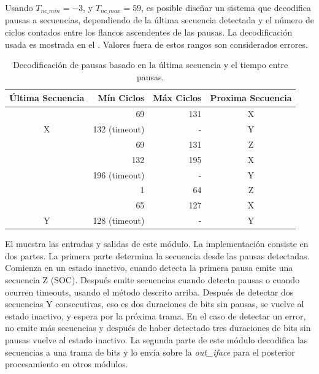 \documentclass[a4paper, twoside, 11pt]{report}
\begin{document}
Usando $T_{nc\_min} = -3$, y $T_{nc\_max} = 59$, es posible diseñar un sistema que decodifica pausas a secuencias, dependiendo de la última secuencia detectada y el número de ciclos contados entre los flancos ascendentes de las pausas. La decodificación usada es mostrada en el . Valores fuera de estos rangos son considerados errores.

\begin{table}[htb]
  \centering
  \begin{tabular}{c|r|r|c}
    \rowcolor{lightgray!35}
    \textbf{Última Secuencia} & \textbf{Mín Ciclos} & \textbf{Máx Ciclos} & \textbf{Proxima Secuencia} \\
    \hline
                        & 69             & 131   & X \\
    \multirow{-2}{*}{X} & 132 (timeout)  & -     & Y \\
    \rowcolor{lightgray!35}
                        & 69             & 131   & Z \\
    \rowcolor{lightgray!35}
                        & 132            & 195   & X \\
    \rowcolor{lightgray!35}
    \multirow{-3}{*}{Z} & 196 (timeout)  & -     & Y \\
                        & 1              & 64    & Z \\
                        & 65             & 127   & X \\
    \multirow{-3}{*}{Y} & 128 (timeout)  & -     & Y \\
  \end{tabular}
  \caption{Decodificación de pausas basado en la última secuencia y el tiempo entre pausas.}
  \label{tab:sequence_decode_timings}
\end{table}

El  muestra las entradas y salidas de este módulo. La implementación consiste en dos partes. La primera parte determina la secuencia desde las pausas detectadas. Comienza en un estado inactivo, cuando detecta la primera pausa emite una secuencia Z (SOC). Después emite secuencias cuando detecta pausas o cuando ocurren timeouts, usando el método descrito arriba. Después de detectar dos secuencias Y consecutivas, eso es dos duraciones de bits sin pausas, se vuelve al estado inactivo, y espera por la próxima trama. En el caso de detectar un error, no emite más secuencias y después de haber detectado tres duraciones de bits sin pausas vuelve al estado inactivo. La segunda parte de este módulo decodifica las secuencias a una trama de bits y lo envía sobre la \textit{out\_iface} para el posterior procesamiento en otros módulos.
\end{document}
